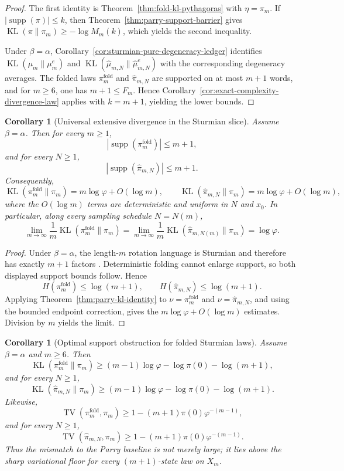 \documentclass[11pt,letterpaper]{article}
\numberwithin{equation}{section}
\theoremstyle{plain}
\newtheorem{corollary}[theorem]{Corollary}
\theoremstyle{definition}
\theoremstyle{remark}
\DeclareMathOperator{\TV}{TV}
\DeclareMathOperator{\KL}{KL}
\DeclareMathOperator{\supp}{supp}
\begin{document}
\begin{proof}
The first identity is Theorem~\ref{thm:fold-kl-pythagoras} with \(\eta=\pi_m\).
If \(|\supp(\pi)|\le k\), then
Theorem~\ref{thm:parry-support-barrier} gives
\(\KL(\pi\|\pi_m)\ge -\log M_m(k)\), which yields the second inequality.

Under \(\beta=\alpha\), Corollary~\ref{cor:sturmian-pure-degeneracy-ledger}
identifies \(\KL(\mu_m\|\mu_m^e)\) and \(\KL(\hat\mu_{m,N}\|\hat\mu_{m,N}^e)\)
with the corresponding degeneracy averages. The folded laws
\(\pi_m^{\mathrm{fold}}\) and \(\hat\pi_{m,N}\) are supported on at most \(m+1\)
words, and for \(m\ge 6\), one has \(m+1\le F_m\). Hence
Corollary~\ref{cor:exact-complexity-divergence-law} applies with \(k=m+1\),
yielding the lower bounds.
\end{proof}

\begin{corollary}[Universal extensive divergence in the Sturmian slice]\label{cor:parry-extensive-rate-sturmian}
Assume \(\beta=\alpha\). Then for every \(m\ge 1\),
\[
|\supp(\pi_m^{\mathrm{fold}})|\le m+1,
\]
and for every \(N\ge 1\),
\[
|\supp(\hat\pi_{m,N})|\le m+1.
\]
Consequently,
\[
\KL(\pi_m^{\mathrm{fold}}\|\pi_m)=m\log\varphi+O(\log m),
\qquad
\KL(\hat\pi_{m,N}\|\pi_m)=m\log\varphi+O(\log m),
\]
where the \(O(\log m)\) terms are deterministic and uniform in \(N\) and
\(x_0\). In particular, along every sampling schedule \(N=N(m)\),
\[
\lim_{m\to\infty}\frac{1}{m}\KL(\pi_m^{\mathrm{fold}}\|\pi_m)
=
\lim_{m\to\infty}\frac{1}{m}\KL(\hat\pi_{m,N(m)}\|\pi_m)
=
\log\varphi.
\]
\end{corollary}

\begin{proof}
Under \(\beta=\alpha\), the length-\(m\) rotation language is Sturmian and
therefore has exactly \(m+1\) factors
\cite{MorseHedlund1940,LindMarcus1995}. Deterministic folding cannot enlarge
support, so both displayed support bounds follow. Hence
\[
H(\pi_m^{\mathrm{fold}})\le \log(m+1),
\qquad
H(\hat\pi_{m,N})\le \log(m+1).
\]
Applying Theorem~\ref{thm:parry-kl-identity} to
\(\nu=\pi_m^{\mathrm{fold}}\) and \(\nu=\hat\pi_{m,N}\), and using the bounded
endpoint correction, gives the \(m\log\varphi+O(\log m)\) estimates. Division
by \(m\) yields the limit.
\end{proof}

\begin{corollary}[Optimal support obstruction for folded Sturmian laws]\label{cor:folded-optimal-support-obstruction}
Assume \(\beta=\alpha\) and \(m\ge 6\). Then
\[
\KL(\pi_m^{\mathrm{fold}}\|\pi_m)
\ge
(m-1)\log\varphi-\log\pi(0)-\log(m+1),
\]
and for every \(N\ge 1\),
\[
\KL(\hat\pi_{m,N}\|\pi_m)
\ge
(m-1)\log\varphi-\log\pi(0)-\log(m+1).
\]
Likewise,
\[
\TV(\pi_m^{\mathrm{fold}},\pi_m)
\ge
1-(m+1)\pi(0)\varphi^{-(m-1)},
\]
and for every \(N\ge 1\),
\[
\TV(\hat\pi_{m,N},\pi_m)
\ge
1-(m+1)\pi(0)\varphi^{-(m-1)}.
\]
Thus the mismatch to the Parry baseline is not merely large; it lies above the
sharp variational floor for every \((m+1)\)-state law on \(X_m\).
\end{corollary}
\end{document}
